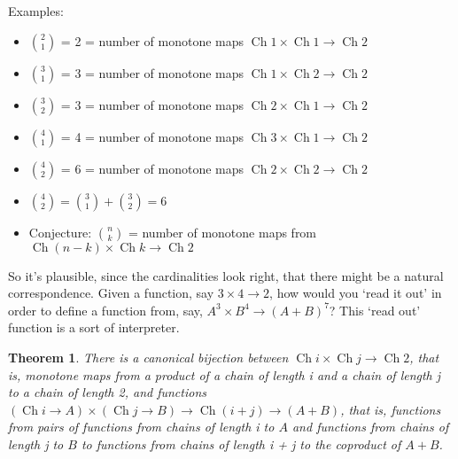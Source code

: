 \documentclass{proc-l}
\newtheorem{theorem}{Theorem}[section]
\theoremstyle{definition}
\theoremstyle{remark}
\numberwithin{equation}{section}
\begin{document}
Examples:
\begin{itemize}
    \item \({2 \choose 1}\) = 2 = number of monotone maps \(\operatorname{Ch} 1 \times \operatorname{Ch} 1 \to \operatorname{Ch} 2\)
    \item \({3 \choose 1}\) = 3 = number of monotone maps \(\operatorname{Ch} 1 \times \operatorname{Ch} 2 \to \operatorname{Ch} 2\)
    \item \({3 \choose 2}\) = 3 = number of monotone maps \(\operatorname{Ch} 2 \times \operatorname{Ch} 1 \to \operatorname{Ch} 2\)
    \item \({4 \choose 1}\) = 4 = number of monotone maps \(\operatorname{Ch} 3 \times \operatorname{Ch} 1 \to \operatorname{Ch} 2\)
    \item \({4 \choose 2}\) = 6 = number of monotone maps \(\operatorname{Ch} 2 \times \operatorname{Ch} 2 \to \operatorname{Ch} 2\)
    \item \({4 \choose 2} = {3 \choose 1} + {3 \choose 2} = 6\)

    \item Conjecture: \({n \choose k}\) = number of monotone maps from \(\operatorname{Ch} (n - k) \times \operatorname{Ch} k \to \operatorname{Ch} 2\)
\end{itemize}


So it's plausible, since the cardinalities look right, that there might be a natural correspondence. Given a function, say \(3 \times 4 \to 2\), how would you `read it out' in order to define a function from, say, \(A^3 \times B^4 \to (A + B)^7\)? This `read out' function is a sort of interpreter.

\begin{theorem}
There is a canonical bijection between \(\operatorname{Ch} i \times \operatorname{Ch} j \to \operatorname{Ch} 2\), that is, monotone maps from a product of a chain of length i and a chain of length j to a chain of length 2, and functions \((\operatorname{Ch} i \to A) \times (\operatorname{Ch} j \to B) \to \operatorname{Ch} (i + j) \to (A + B)\),
that is, functions from pairs of functions from chains of length i to \(A\) and functions from chains of length j to \(B\) to functions from chains of length i + j to the coproduct of \(A + B\).
\end{theorem}
\end{document}
